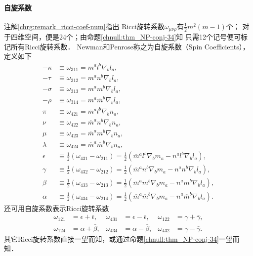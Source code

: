 \paragraph{自旋系数}
注解\ref{chrg:remark_ricci-coef-num}指出
Ricci旋转系数$\omega_{\mu\nu\rho}$有$\frac{1}{2}m^2(m-1)$个；
对于四维空间，便是24个；由命题\ref{chnull:thm_NP-conj-34}知
只需12个记号便可标记所有Ricci旋转系数．
Newman和Penrose称之为自旋系数（Spin Coefficients），定义如下
\begin{subequations}\label{chnull:eqn_spincoef-all}
    \begin{align}
        -\kappa &\equiv \omega_{311}=m^a l^b \nabla_b l_a,  \\
        -\tau   &\equiv \omega_{312}=m^a n^b \nabla_b l_a, \\
        -\sigma &\equiv \omega_{313}=m^a m^b \nabla_b l_a, \\
        -\rho   &\equiv \omega_{314}=m^a \overline{m}^b \nabla_b l_a, \\
        \pi    &\equiv \omega_{421}=\overline{m}^a l^b \nabla_b n_a,  \\
        \nu    &\equiv \omega_{422}=\overline{m}^a n^b \nabla_b n_a,   \\
        \mu    &\equiv \omega_{423}=\overline{m}^a m^b \nabla_b n_a,   \\
        \lambda&\equiv \omega_{424}=\overline{m}^a \overline{m}^b \nabla_b n_a,   \\
        \epsilon&\equiv \frac{1}{2}(\omega_{431} - \omega_{211})
        =\frac{1}{2}(\overline{m}^a l^b\nabla_b m_a - n^a l^b\nabla_b l_a ), \\
        \gamma &\equiv \frac{1}{2}(\omega_{432} - \omega_{212})
        =\frac{1}{2}(\overline{m}^a n^b\nabla_b m_a - n^a n^b\nabla_b l_a ), \\
        \beta &\equiv \frac{1}{2}(\omega_{433} - \omega_{213})
        =\frac{1}{2}(\overline{m}^a m^b\nabla_b m_a - n^a m^b\nabla_b l_a ),  \\
        \alpha &\equiv \frac{1}{2}(\omega_{434} - \omega_{214})
        =\frac{1}{2}(\overline{m}^a \overline{m}^b\nabla_b m_a- n^a \overline{m}^b\nabla_b l_a ) .
    \end{align}
\end{subequations}
还可用自旋系数表示Ricci旋转系数
\begin{equation}\label{chnull:eqn_omegas-by-spin-coefs}
    \begin{aligned}
        \omega_{121} &= \epsilon + \bar{\epsilon}, & \omega_{431} &= \epsilon - \bar{\epsilon}, &
        \omega_{122} &= \gamma + \bar{\gamma},  \\
        \omega_{124} &= \alpha + \bar{\beta},  & \omega_{434} &= \alpha - \bar{\beta}, &
        \omega_{432} &= \gamma - \bar{\gamma} .
    \end{aligned}
\end{equation}
其它Ricci旋转系数直接一望而知，或通过命题\ref{chnull:thm_NP-conj-34}一望而知．

